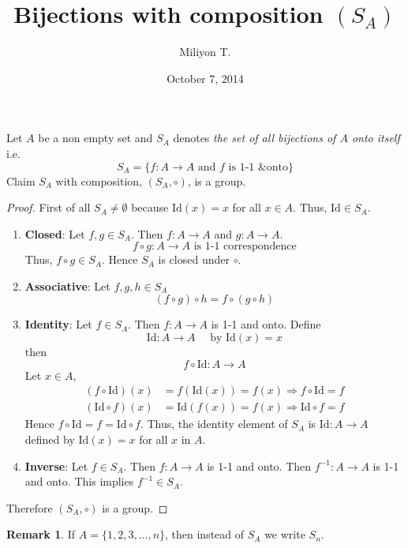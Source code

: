 \documentclass[12pt]{article}
\theoremstyle{definition}
\newtheorem{rem}[thm]{Remark}
\begin{document}
\nocite{}

\title{Bijections with composition $(S_A)$}

\author{Miliyon T.}
\date{October 7, 2014}
\maketitle



Let $A$ be a non empty set and $S_A$ denotes \textit{the set of all bijections of $A$ onto itself} i.e.
\[
S_A=\{f:A \to A\mbox{ and } f \mbox{ is 1-1 \& onto}\}
\]
Claim $S_A$ with composition, $(S_A,\circ)$, is a group.
\begin{proof}
First of all $S_A\neq \emptyset$ because $\mbox{Id}(x)=x$ for all $x\in A$. Thus, $\mbox{Id}\in S_A$.
\begin{enumerate}
  \item \textbf{Closed}: Let $f,g\in S_A$. Then $f:A \to A$ and $g:A \to A$.
  \[
  f\circ g:A \to A \mbox{ is 1-1 correspondence}
  \]
  Thus, $f\circ g\in S_A$. Hence $S_A$ is closed under $\circ$.
  \item \textbf{Associative}: Let $f,g,h\in S_A$
  \[
  (f\circ g)\circ h=f\circ(g\circ h)\tag{Composition of function is associative}
  \] 
  \item \textbf{Identity}: Let $f\in S_A$. Then $f:A \to A$ is 1-1 and onto. Define 
  \[
  \mbox{Id}:A \to A\quad\mbox{ by } \mbox{Id}(x)=x
  \] 
  then
  \[
  f\circ\mbox{Id}:A \to A
  \]
  Let $x\in A$,
  \begin{align*}
  (f\circ\mbox{Id})(x) & =f(\mbox{Id}(x))=f(x)\Rightarrow f\circ\mbox{Id}=f\\
  (\mbox{Id}\circ f)(x) &=\mbox{Id}(f(x))=f(x)\Rightarrow \mbox{Id}\circ f=f
  \end{align*}
  Hence $f\circ\mbox{Id}=f=\mbox{Id}\circ f$. Thus, the identity element of $S_A$ is $\mbox{Id}:A\to A$ defined by $\mbox{Id}(x)=x$ for all $x$ in $A$.
  \item \textbf{Inverse}: Let $f\in S_A$. Then $f:A \to A$ is 1-1 and onto. Then $f^{-1}:A \to A$ is 1-1 and onto. This implies $f^{-1}\in S_A$.  
\end{enumerate}
Therefore $(S_A,\circ)$ is a group.
\end{proof}

\begin{rem}
If $A=\{1,2,3,\ldots,n\}$, then instead of $S_A$ we write $S_n$.
\end{rem}
\end{document}
